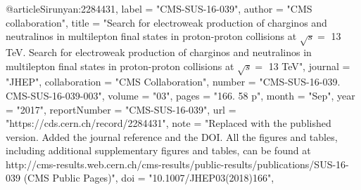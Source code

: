 @article{Sirunyan:2284431,
      label          = "CMS-SUS-16-039",
      author        = "{CMS collaboration}",
      title         = "{Search for electroweak production of charginos and
                       neutralinos in multilepton final states in proton-proton
                       collisions at $\sqrt{s} = $ 13 TeV. Search for electroweak
                       production of charginos and neutralinos in multilepton
                       final states in proton-proton collisions at $\sqrt{s}=$ 13
                       TeV}",
      journal       = "JHEP",
      collaboration = "CMS Collaboration",
      number        = "CMS-SUS-16-039. CMS-SUS-16-039-003",
      volume        = "03",
      pages         = "166. 58 p",
      month         = "Sep",
      year          = "2017",
      reportNumber  = "CMS-SUS-16-039",
      url           = "https://cds.cern.ch/record/2284431",
      note          = "Replaced with the published version. Added the journal
                       reference and the DOI. All the figures and tables,
                       including additional supplementary figures and tables, can
                       be found at
                       http://cms-results.web.cern.ch/cms-results/public-results/publications/SUS-16-039
                       (CMS Public Pages)",
      doi           = "10.1007/JHEP03(2018)166",
}

